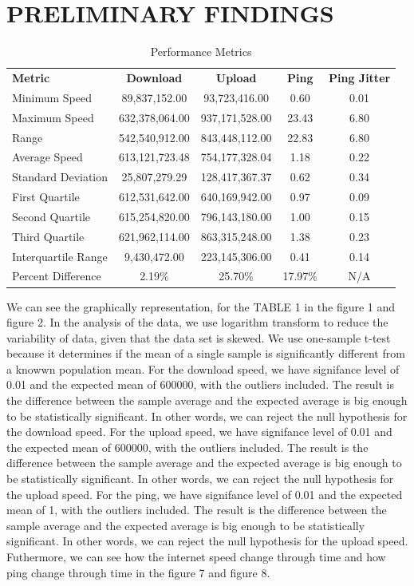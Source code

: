 \documentclass[conference]{IEEEtran}
\begin{document}
\section{PRELIMINARY FINDINGS}
\begin{table}[htbp]
    \centering
    \caption{Performance Metrics}
    \begin{tabular}{lcccc}
        \textbf{Metric} & \textbf{Download} & \textbf{Upload} & \textbf{Ping} & \textbf{Ping Jitter} \\
        Minimum Speed & 89,837,152.00 & 93,723,416.00 & 0.60 & 0.01 \\
        Maximum Speed & 632,378,064.00 & 937,171,528.00 & 23.43 & 6.80 \\
        Range & 542,540,912.00 & 843,448,112.00 & 22.83 & 6.80 \\
        Average Speed & 613,121,723.48 & 754,177,328.04 & 1.18 & 0.22 \\
        Standard Deviation & 25,807,279.29 & 128,417,367.37 & 0.62 & 0.34 \\
        First Quartile & 612,531,642.00 & 640,169,942.00 & 0.97 & 0.09 \\
        Second Quartile & 615,254,820.00 & 796,143,180.00 & 1.00 & 0.15 \\
        Third Quartile & 621,962,114.00 & 863,315,248.00 & 1.38 & 0.23 \\
        Interquartile Range & 9,430,472.00 & 223,145,306.00 & 0.41 & 0.14 \\
        Percent Difference & 2.19\% & 25.70\% & 17.97\% & N/A \\
    \end{tabular}
    \label{tab:performance}
\end{table}
We can see the graphically representation, for the TABLE 1 in the figure 1 and figure 2.
In the analysis of the data, we use logarithm transform to reduce the variability of data, given that the data set is skewed.
We use one-sample t-test because it determines if the mean of a single sample is significantly different from a knowwn population mean.
For the download speed, we have signifance level of 0.01 and the expected mean of 600000, with the outliers included. 
The result is the difference between the sample average and the expected average is big enough to be statistically significant. 
In other words, we can reject the null hypothesis for the download speed.
For the upload speed, we have signifance level of 0.01 and the expected mean of 600000, with the outliers included. 
The result is the difference between the sample average and the expected average is big enough to be statistically significant. 
In other words, we can reject the null hypothesis for the upload speed.
For the ping, we have signifance level of 0.01 and the expected mean of 1, with the outliers included. 
The result is the difference between the sample average and the expected average is big enough to be statistically significant. 
In other words, we can reject the null hypothesis for the upload speed.
Futhermore, we can see how the internet speed change through time and how ping change through time in the figure 7 and figure 8.
\end{document}
